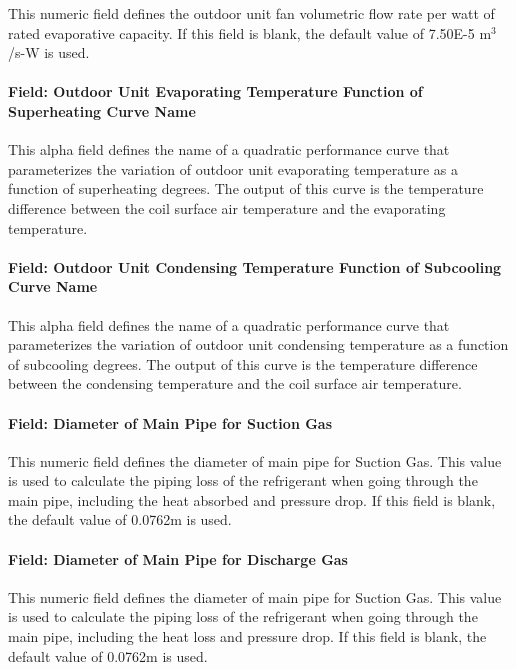 This numeric field defines the outdoor unit fan volumetric flow rate per watt of rated evaporative capacity. If this field is blank, the default value of 7.50E-5 m\(^{3}\)/s-W is used.

\paragraph{Field: Outdoor Unit Evaporating Temperature Function of Superheating Curve Name}

This alpha field defines the name of a quadratic performance curve that parameterizes the variation of outdoor unit evaporating temperature as a function of superheating degrees. The output of this curve is the temperature difference between the coil surface air temperature and the evaporating temperature.

\paragraph{Field: Outdoor Unit Condensing Temperature Function of Subcooling Curve Name}

This alpha field defines the name of a quadratic performance curve that parameterizes the variation of outdoor unit condensing temperature as a function of subcooling degrees. The output of this curve is the temperature difference between the condensing temperature and the coil surface air temperature.

\paragraph{Field: Diameter of Main Pipe for Suction Gas}

This numeric field defines the diameter of main pipe for Suction Gas. This value is used to calculate the piping loss of the refrigerant when going through the main pipe, including the heat absorbed and pressure drop. If this field is blank, the default value of 0.0762m is used.

\paragraph{Field: Diameter of Main Pipe for Discharge Gas}

This numeric field defines the diameter of main pipe for Suction Gas. This value is used to calculate the piping loss of the refrigerant when going through the main pipe, including the heat loss and pressure drop. If this field is blank, the default value of 0.0762m is used.

